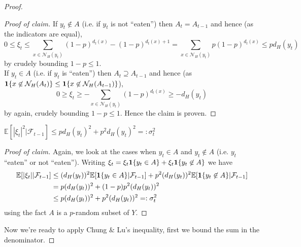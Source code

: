 \documentclass{article}
\begin{document}
\begin{proof}
\begin{proof}[Proof of claim]
        If $y_t \not\in A$ (i.e. if $y_t$ is not ``eaten'') then $A_t = A_{t-1}$ and hence (as the indicators are equal),
        \[0 \leq \xi_t \leq \sum_{x \in \mathcal{N}_H(y_t)}(1-p)^{d_t(x)} - (1-p)^{d_t(x) + 1} = 
        \sum_{x \in \mathcal{N}_H(y_t)}p(1-p)^{d_t(x)} \leq pd_H(y_t)\] 
        by crudely bounding $1 - p \leq 1$. \\

        If $y_t \in A$ (i.e. if $y_t$ is ``eaten'') then $A_t \supseteq A_{t-1}$ and hence (as ${\bf 1}\{x \not\in
        \mathcal{N}_H(A_t)\} \leq {\bf 1}\{x \not\in \mathcal{N}_H(A_{t-1})\}$),
        \[0 \geq \xi_t \geq - \sum_{x \in \mathcal{N}_H(y_t)}(1-p)^{d_t(x)} \geq -d_H(y_t)\]
        by again, crudely bounding $1 - p \leq 1$. Hence the claim is proven.
    \end{proof}

    \begin{claim}[]{}
        $\mathbb{E}[|\xi_t|^2 | \mathcal{F}_{t-1}] \leq pd_H(y_t)^2 + p^2d_H(y_t)^2 =: \sigma^2_t$
    \end{claim}
    \begin{proof}[Proof of claim]
        Again, we look at the cases when $y_t \in A$ and $y_t \not\in A$ (i.e. $y_t$ ``eaten'' or not ``eaten''). 
        Writing $\xi_t = \xi_t{\bf 1}\{y_t \in A\} + \xi_t{\bf 1}\{y_t \not\in A\}$ we have 
        \begin{align*}
            \mathbb{E}[|\xi_t| | \mathcal{F}_{t-1}] &\leq 
            (d_H(y_t))^2\mathbb{E}[{\bf 1}\{y_t \in A\} | \mathcal{F}_{t-1}] + 
            p^2(d_H(y_t))^2\mathbb{E}[{\bf 1}\{y_t \not\in A\} | \mathcal{F}_{t-1}] \\
            &= p(d_H(y_t))^2 + (1-p)p^2(d_H(y_t))^2  \\ 
            &\leq p(d_H(y_t))^2 + p^2(d_H(y_t))^2 =: \sigma_t^2
        \end{align*}
        using the fact $A$ is a $p$-random subset of $Y$. 
    \end{proof}

    Now we're ready to apply Chung $\&$ Lu's inequality, first we bound the sum in the denominator. 


\end{proof}
\end{document}
